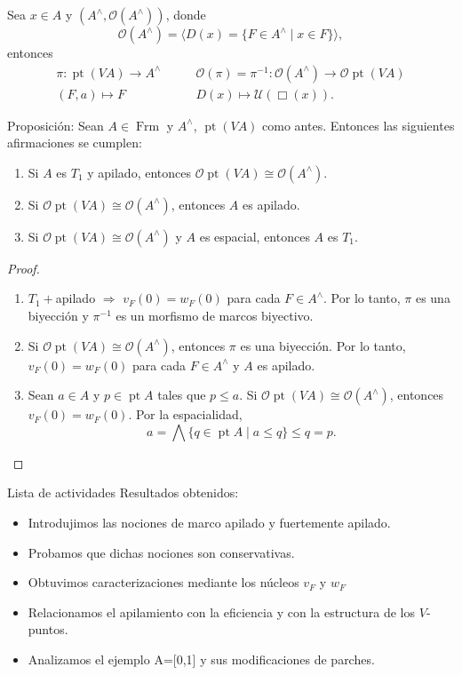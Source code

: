 \documentclass[compress,12pt]{beamer}
\DeclareMathOperator{\pt}{pt}
\DeclareMathOperator{\Frm}{Frm}
\begin{document}
\begin{frame}[fragile]
Sea $x\in A$ y $(A^\wedge, \mathcal{O}(A^\wedge))$, donde 
\[
\mathcal{O}(A^\wedge)=\langle D(x)=\{F\in A^\wedge\mid x\in F\}\rangle  ,
\]
entonces
\[
\begin{split}
\pi\colon \pt(VA)\to A^\wedge \quad & \quad \mathcal{O}(\pi)=\pi^{-1}\colon \mathcal{O}(A^\wedge) \to \mathcal{O}\pt(VA) \\
(F, a)\mapsto F \quad & \quad D(x)\mapsto \mathcal{U}(\Box(x)).
\end{split}
\]

\begin{block}{Proposición:}
Sean $A\in \Frm$ y $A^\wedge$, $\pt(VA)$ como antes. Entonces las siguientes afirmaciones se cumplen:
\begin{enumerate}
  \item Si $A$ es $T_1$ y apilado, entonces $\mathcal{O}\pt(VA)\cong \mathcal{O}(A^\wedge)$.
  \item Si $\mathcal{O}\pt(VA)\cong \mathcal{O}(A^\wedge)$, entonces $A$ es apilado. 
  \item Si $\mathcal{O}\pt(VA)\cong \mathcal{O}(A^\wedge)$ y $A$ es espacial, entonces $A$ es $T_1$.
\end{enumerate}
\end{block}
\end{frame}

\begin{frame}
\begin{proof}
\begin{enumerate}
\item $T_1+$apilado $\Rightarrow$ $v_F(0)=w_F(0)$ para cada $F\in A^\wedge$. Por lo tanto, $\pi$ es una biyección y $\pi^{-1}$ es un morfismo de marcos biyectivo.
\item Si $\mathcal{O}\pt(VA)\cong \mathcal{O}(A^\wedge)$, entonces $\pi$ es una biyección. Por lo tanto, $v_F(0)=w_F(0)$ para cada $F\in A^\wedge$ y $A$ es apilado.
\item Sean $a\in A$ y $p\in \pt A$ tales que $p\leq a$. Si  $\mathcal{O}\pt(VA)\cong \mathcal{O}(A^\wedge)$, entonces $v_F(0)=w_F(0)$.
Por la espacialidad, 
\[
a=\bigwedge\{q\in \pt A\mid a\leq q\}\leq q=p.
\]
\end{enumerate}
\end{proof}
\end{frame}


\begin{frame}{Lista de actividades}
Resultados obtenidos:
\begin{itemize}
  \item Introdujimos las nociones de marco apilado y fuertemente apilado.
  \item Probamos que dichas nociones son conservativas.
  \item Obtuvimos caracterizaciones mediante los núcleos $v_F$ y $w_F$
  \item Relacionamos el apilamiento con la eficiencia y con la estructura de los $V$-puntos.
  \item Analizamos el ejemplo A=[0,1] y sus modificaciones de parches.
\end{itemize}
\end{frame}
\end{document}

